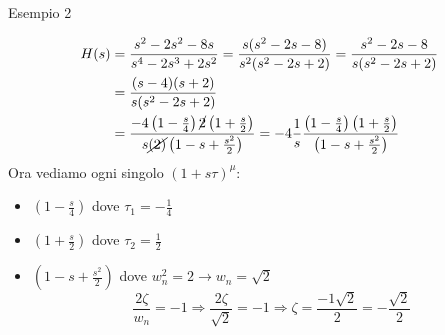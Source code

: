 \documentclass[a4paper]{article}
\begin{document}
\begin{examplebox}{Esempio 2}
    
    \begin{align*}
        H(s) &= \frac{s^2-2s^2-8s}{s^4 - 2s^3 + 2s^2} = \frac{s(s^2-2s-8)}{s^2(s^2-2s+2)} = \frac{s^2-2s-8}{s(s^2-2s+2)}\\
        &= \frac{(s-4)(s+2)}{s(s^2-2s+2)}\\
        &= \frac{-4\left(1 - \frac{s}{4}\right)\cancel{2}\left(1 + \frac{s}{2}\right)}{s\cancel{(2)}\left(1 - s + \frac{s^2}{2}\right)} = -4\frac{1}{s}\frac{\left(1 - \frac{s}{4}\right)\left(1 + \frac{s}{2}\right)}{\left(1 - s + \frac{s^2}{2}\right)}\\
    \end{align*}
    Ora vediamo ogni singolo $(1 + s\tau)^{\mu}$:
    \begin{itemize}
        \item $\left(1 - \frac{s}{4}\right)$ dove $\tau_1 = -\frac{1}{4}$
        \item $\left(1 + \frac{s}{2}\right)$ dove $\tau_2 = \frac{1}{2}$
        \item $\left(1 - s + \frac{s^2}{2}\right)$ dove $w_n^2 = 2 \rightarrow w_n = \sqrt{2}$
        \[\frac{2\zeta}{w_n} = -1 \Longrightarrow \frac{2\zeta}{\sqrt{2}} = -1 \Longrightarrow \zeta = \frac{-1\sqrt{2}}{2} = -\frac{\sqrt{2}}{2}\]
    \end{itemize}
   
\end{examplebox}
\end{document}
